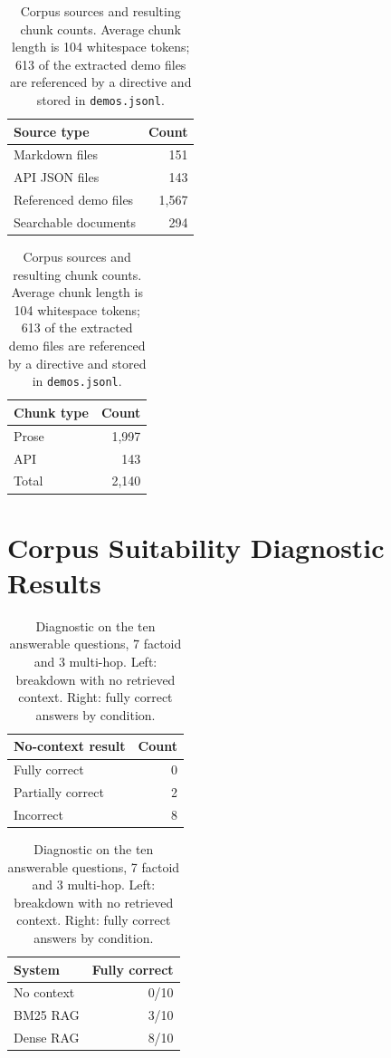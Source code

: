 \documentclass[10pt,a4paper]{article}
\begin{document}
\begin{table}[h]
\centering
\small
\begin{tabular}{lr}
\toprule
Source type & Count \\
\midrule
Markdown files & 151 \\
API JSON files & 143 \\
Referenced demo files & 1{,}567 \\
\midrule
Searchable documents & 294 \\
\bottomrule
\end{tabular}
\hspace{2em}
\begin{tabular}{lr}
\toprule
Chunk type & Count \\
\midrule
Prose & 1{,}997 \\
API & 143 \\
\midrule
Total & 2{,}140 \\
\bottomrule
\end{tabular}
\caption{Corpus sources and resulting chunk counts. Average chunk length is 104 whitespace tokens; 613 of the extracted demo files are referenced by a directive and stored in \texttt{demos.jsonl}.}
\label{tab:corpus}
\end{table}

\section{Corpus Suitability Diagnostic Results}
\label{app:diagnostic}

\begin{table}[h]
\centering
\small
\begin{tabular}{lr}
\toprule
No-context result & Count \\
\midrule
Fully correct & 0 \\
Partially correct & 2 \\
Incorrect & 8 \\
\bottomrule
\end{tabular}
\hspace{2em}
\begin{tabular}{lr}
\toprule
System & Fully correct \\
\midrule
No context & 0/10 \\
BM25 RAG & 3/10 \\
Dense RAG & 8/10 \\
\bottomrule
\end{tabular}
\caption{Diagnostic on the ten answerable questions, 7 factoid and 3 multi-hop. Left: breakdown with no retrieved context. Right: fully correct answers by condition.}
\label{tab:diagnostic}
\end{table}
\end{document}
